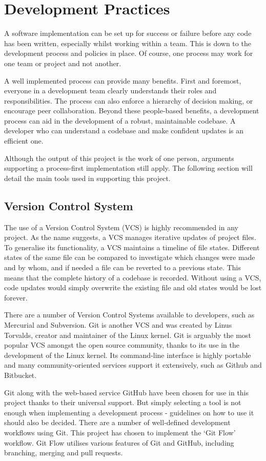 \chapter{Development Practices}
  A software implementation can be set up for success or failure before any code has been written, especially whilst working within a team. This is down to the development process and policies in place. Of course, one process may work for one team or project and not another.

  A well implemented process can provide many benefits. First and foremost, everyone in a development team clearly understands their roles and responsibilities. The process can also enforce a hierarchy of decision making, or encourage peer collaboration. Beyond these people-based benefits, a development process can aid in the development of a robust, maintainable codebase. A developer who can understand a codebase and make confident updates is an efficient one.

  Although the output of this project is the work of one person, arguments supporting a process-first implementation still apply. The following section will detail the main tools used in supporting this project. 

  \section{Version Control System}
    The use of a Version Control System (VCS) is highly recommended in any project. As the name suggests, a VCS manages iterative updates of project files. To generalise its functionality, a VCS maintains a timeline of file states. Different states of the same file can be compared to investigate which changes were made and by whom, and if needed a file can be reverted to a previous state. This means that the complete history of a codebase is recorded. Without using a VCS, code updates would simply overwrite the existing file and old states would be lost forever.

    There are a number of Version Control Systems available to developers, such as Mercurial and Subversion. Git is another VCS and was created by Linus Torvalds, creator and maintainer of the Linux kernel. Git is arguably the most popular VCS amongst the open source community, thanks to its use in the development of the Linux kernel. Its command-line interface is highly portable and many community-oriented services support it extensively, such as Github and Bitbucket.

    Git along with the web-based service GitHub have been chosen for use in this project thanks to their universal support. But simply selecting a tool is not enough when implementing a development process - guidelines on how to use it should also be decided. There are a number of well-defined development workflows using Git. This project has chosen to implement the `Git Flow' workflow. Git Flow utilises various features of Git and GitHub, including branching, merging and pull requests. 

